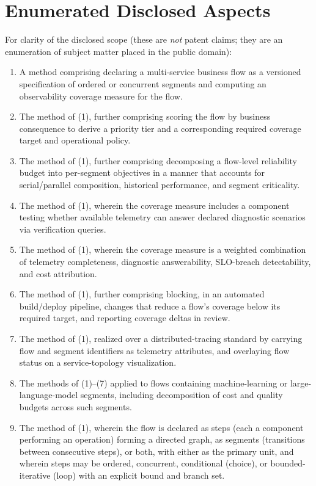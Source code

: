 \documentclass[11pt]{article}
\begin{document}
\section{Enumerated Disclosed Aspects}
For clarity of the disclosed scope (these are \emph{not} patent claims; they are an enumeration of subject matter placed in the public domain):

\begin{enumerate}[label=\arabic*.]
\item A method comprising declaring a multi-service business flow as a versioned specification of ordered or concurrent segments and computing an observability coverage measure for the flow.
\item The method of (1), further comprising scoring the flow by business consequence to derive a priority tier and a corresponding required coverage target and operational policy.
\item The method of (1), further comprising decomposing a flow-level reliability budget into per-segment objectives in a manner that accounts for serial/parallel composition, historical performance, and segment criticality.
\item The method of (1), wherein the coverage measure includes a component testing whether available telemetry can answer declared diagnostic scenarios via verification queries.
\item The method of (1), wherein the coverage measure is a weighted combination of telemetry completeness, diagnostic answerability, SLO-breach detectability, and cost attribution.
\item The method of (1), further comprising blocking, in an automated build/deploy pipeline, changes that reduce a flow's coverage below its required target, and reporting coverage deltas in review.
\item The method of (1), realized over a distributed-tracing standard by carrying flow and segment identifiers as telemetry attributes, and overlaying flow status on a service-topology visualization.
\item The methods of (1)--(7) applied to flows containing machine-learning or large-language-model segments, including decomposition of cost and quality budgets across such segments.
\item The method of (1), wherein the flow is declared as steps (each a component performing an operation) forming a directed graph, as segments (transitions between consecutive steps), or both, with either as the primary unit, and wherein steps may be ordered, concurrent, conditional (choice), or bounded-iterative (loop) with an explicit bound and branch set.

\end{enumerate}
\end{document}
